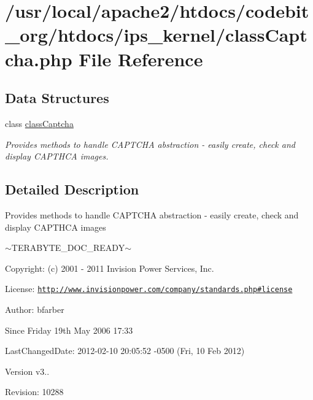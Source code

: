 \hypertarget{class_captcha_8php}{\section{/usr/local/apache2/htdocs/codebit\-\_\-org/htdocs/ips\-\_\-kernel/class\-Captcha.php File Reference}
\label{class_captcha_8php}
}
\subsection*{Data Structures}
\begin{DoxyCompactItemize}
\item 
class \hyperlink{classclass_captcha}{class\-Captcha}
\begin{DoxyCompactList}\small\item\em Provides methods to handle C\-A\-P\-T\-C\-H\-A abstraction -\/ easily create, check and display C\-A\-P\-T\-H\-C\-A images. \end{DoxyCompactList}\end{DoxyCompactItemize}


\subsection{Detailed Description}
\begin{DoxyVerb}  Provides methods to handle CAPTCHA abstraction - easily create, check and display CAPTHCA images
\end{DoxyVerb}
 $\sim$\-T\-E\-R\-A\-B\-Y\-T\-E\-\_\-\-D\-O\-C\-\_\-\-R\-E\-A\-D\-Y$\sim$ \begin{DoxyParagraph}{Copyright\-:}
(c) 2001 -\/ 2011 Invision Power Services, Inc.
\end{DoxyParagraph}
\begin{DoxyParagraph}{License\-:}
\href{http://www.invisionpower.com/company/standards.php#license}{\tt http\-://www.\-invisionpower.\-com/company/standards.\-php\#license}
\end{DoxyParagraph}
\begin{DoxyParagraph}{Author\-:}
bfarber 
\end{DoxyParagraph}
\begin{DoxySince}{Since}
Friday 19th May 2006 17\-:33 
\end{DoxySince}
\begin{DoxyParagraph}{Last\-Changed\-Date\-:}
2012-\/02-\/10 20\-:05\-:52 -\/0500 (Fri, 10 Feb 2012) 
\end{DoxyParagraph}
\begin{DoxyVersion}{Version}
v3.. 
\end{DoxyVersion}
\begin{DoxyParagraph}{Revision\-:}
10288 
\end{DoxyParagraph}
